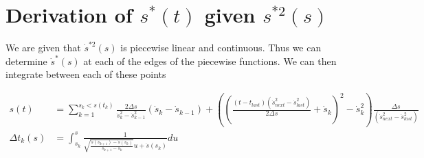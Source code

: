 \chapter{Derivation of $s^*(t)$ given $s^{*2}(s)$}

We are given that $\dot{s}^{*2}(s)$ is piecewise linear and continuous. Thus we can determine $\dot{s}^*(s)$ at each of the edges of the piecewise functions. We can then integrate between each of these points 

\begin{align*}
s(t) &= \sum_{k=1}^{s_k < s(t_k)} \frac{2\Delta s}{\dot{s}^2_k - \dot{s}^2_{k-1}} \left(\dot{s}_k -\dot{s}_{k-1}\right) + \left(\left(\frac{(t-t_{last})(\dot{s}^2_{next} - \dot{s}^2_{last})}{2 \Delta s} + \dot{s}_k\right)^2 - \dot{s}^2_k \right)\frac{\Delta s}{(\dot{s}^2_{next} - \dot{s}^2_{last})}\\	
\Delta t_k(s) &= \int_{s_k}^s \frac{1}{\sqrt{\frac{\dot{s}(s_{k+1}) - \dot{s}(s_{k})}{s_{k+1} - s_{k}}} u + \dot{s}(s_{k})} du
\end{align*}